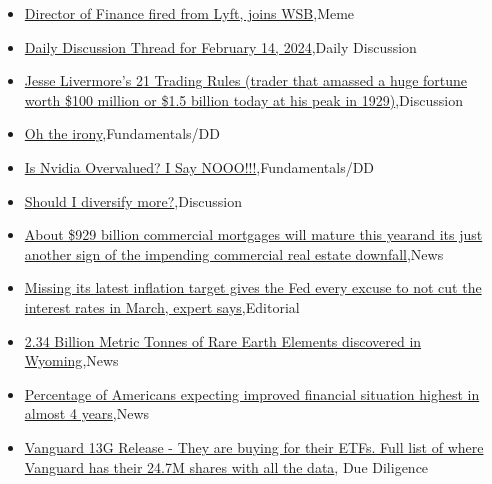 \documentclass{article}%
\begin{document}
%
\begin{itemize}%
\item%
\href{https://reddit.com/r/wallstreetbets/comments/1aqktpi/director\_of\_finance\_fired\_from\_lyft\_joins\_wsb/}{Director of Finance fired from Lyft, joins WSB},Meme%
\item%
\href{https://reddit.com/r/wallstreetbets/comments/1aqka4s/daily\_discussion\_thread\_for\_february\_14\_2024/}{Daily Discussion Thread for February 14, 2024},Daily Discussion%
\item%
\href{https://reddit.com/r/wallstreetbets/comments/1aqg9ef/jesse\_livermores\_21\_trading\_rules\_trader\_that/}{Jesse Livermore's 21 Trading Rules (trader that amassed a huge fortune worth \$100 million or \$1.5 billion today at his peak in 1929)},Discussion%
\item%
\href{https://reddit.com/r/StockMarket/comments/1aqm178/oh\_the\_irony/}{Oh the irony},Fundamentals/DD%
\item%
\href{https://reddit.com/r/StockMarket/comments/1aqg9e3/is\_nvidia\_overvalued\_i\_say\_nooo/}{Is Nvidia Overvalued? I Say NOOO!!!},Fundamentals/DD%
\item%
\href{https://reddit.com/r/StockMarket/comments/1aqdb2z/should\_i\_diversify\_more/}{Should I diversify more?},Discussion%
\item%
\href{https://reddit.com/r/Economics/comments/1aqceej/about\_929\_billion\_commercial\_mortgages\_will/}{About \$929 billion commercial mortgages will mature this yearand its just another sign of the impending commercial real estate downfall},News%
\item%
\href{https://reddit.com/r/Economics/comments/1aqaas4/missing\_its\_latest\_inflation\_target\_gives\_the\_fed/}{Missing its latest inflation target gives the Fed every excuse to not cut the interest rates in March, expert says},Editorial%
\item%
\href{https://reddit.com/r/Economics/comments/1aq7x20/234\_billion\_metric\_tonnes\_of\_rare\_earth\_elements/}{2.34 Billion Metric Tonnes of Rare Earth Elements discovered in Wyoming},News%
\item%
\href{https://reddit.com/r/Economics/comments/1aq56rb/percentage\_of\_americans\_expecting\_improved/}{Percentage of Americans expecting improved financial situation highest in almost 4 years},News%
\item%
\href{https://reddit.com/r/Superstonk/comments/1aqbcc4/vanguard\_13g\_release\_they\_are\_buying\_for\_their/}{Vanguard 13G Release - They are buying for their ETFs. Full list of where Vanguard has their 24.7M shares with all the data}, Due Diligence%
\end{itemize}%
\end{document}
